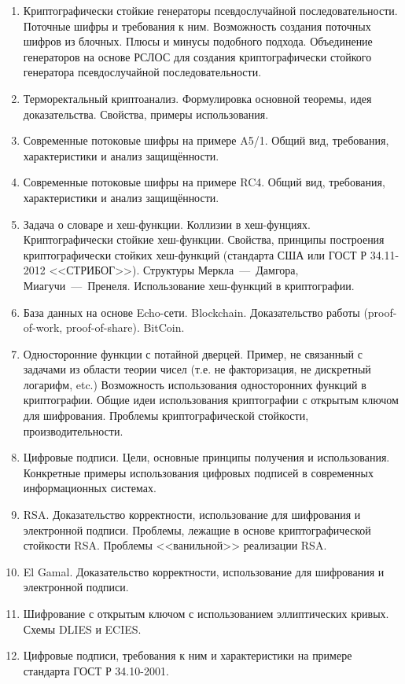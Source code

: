 \begin{enumerate}
    \item Криптографически стойкие генераторы псевдослучайной последовательности. Поточные шифры и требования к ним. Возможность создания поточных шифров из блочных. Плюсы и минусы подобного подхода. Объединение генераторов на основе РСЛОС для создания криптографически стойкого генератора псевдослучайной последовательности.
    \item Терморектальный криптоанализ. Формулировка основной теоремы, идея доказательства. Свойства, примеры использования.
    \item Современные потоковые шифры на примере A5/1. Общий вид, требования, характеристики и анализ защищённости.
    \item Современные потоковые шифры на примере RC4. Общий вид, требования, характеристики и анализ защищённости.
    \item Задача о словаре и хеш-функции. Коллизии в хеш-фунциях. Криптографически стойкие хеш-функции. Свойства, принципы построения криптографически стойких хеш-функций (стандарта США или ГОСТ Р 34.11-2012 <<СТРИБОГ>>). Структуры Меркла~---~Дамгора, Миагучи~---~Пренеля. Использование хеш-функций в криптографии.
    \item База данных на основе Echo-сети. Blockchain. Доказательство работы (proof-of-work, proof-of-share). BitCoin.
    \item Односторонние функции с потайной дверцей. Пример, не связанный с задачами из области теории чисел (т.е. не факторизация, не дискретный логарифм, etc.) Возможность использования односторонних функций в криптографии. Общие идеи использования криптографии с открытым ключом для шифрования. Проблемы криптографической стойкости, производительности.
    \item Цифровые подписи. Цели, основные принципы получения и использования. Конкретные примеры использования цифровых подписей в современных информационных системах.
    \item RSA. Доказательство корректности, использование для шифрования и электронной подписи. Проблемы, лежащие в основе криптографической стойкости RSA. Проблемы <<ванильной>> реализации RSA.
    \item El Gamal. Доказательство корректности, использование для шифрования и электронной подписи.
    \item Шифрование с открытым ключом с использованием эллиптических кривых. Схемы DLIES и ECIES.
    \item Цифровые подписи, требования к ним и характеристики на примере стандарта ГОСТ Р 34.10-2001.

\end{enumerate}
